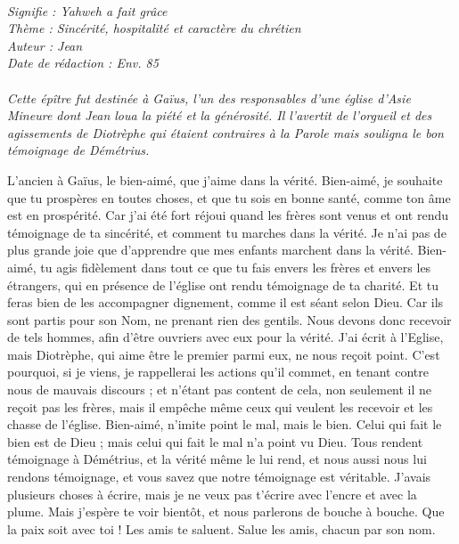 \BFont
\noindent\hrulefill
{\footnotesize
\textit{
\bigskip
{\centering{}
\\Signifie : Yahweh a fait grâce
\\Thème : Sincérité, hospitalité et caractère du chrétien
\\Auteur : Jean
\\Date de rédaction : Env. 85\\}
}
\textit{
\\Cette épître fut destinée à Gaïus, l’un des responsables d’une église d’Asie Mineure dont Jean loua la piété et la générosité. Il l’avertit de l’orgueil et des agissements de Diotrèphe qui étaient contraires à la Parole mais souligna le bon témoignage de Démétrius.\bigskip
}
}
\par\nobreak\noindent\hrulefill
\begin{multicols}{2}
\TextTitle{[Introduction]}
\VerseOne{}L'ancien à Gaïus, le bien-aimé, que j'aime dans la vérité.
Bien-aimé, je souhaite que tu prospères{} en toutes choses, et que tu sois en bonne santé, comme ton âme est en prospérité.
Car j’ai été fort réjoui quand les frères sont venus et ont rendu témoignage de ta sincérité, et comment tu marches dans la vérité.
Je n'ai pas de plus grande joie que d’apprendre que mes enfants marchent dans la vérité.
\TextTitle{[L'hospitalité]}
Bien-aimé, tu agis fidèlement dans tout ce que tu fais envers les frères et envers les étrangers,
qui en présence de l'église ont rendu témoignage de ta charité. Et tu feras bien de les accompagner dignement, comme il est séant selon Dieu.
Car ils sont partis pour son Nom, ne prenant rien des gentils.
Nous devons donc recevoir de tels hommes, afin d’être ouvriers avec eux pour la vérité.
J'ai écrit à l'Eglise, mais Diotrèphe, qui aime être le premier parmi eux, ne nous reçoit point.
C'est pourquoi, si je viens, je rappellerai les actions qu'il commet, en tenant contre nous de mauvais discours ; et n'étant pas content de cela, non seulement il ne reçoit pas les frères, mais il empêche même ceux qui veulent les recevoir et les chasse de l'église.
Bien-aimé, n'imite point le mal, mais le bien. Celui qui fait le bien est de Dieu ; mais celui qui fait le mal n'a point vu Dieu.
Tous rendent témoignage à Démétrius, et la vérité même le lui rend, et nous aussi nous lui rendons témoignage, et vous savez que notre témoignage est véritable.
\TextTitle{[Conclusion]}
J'avais plusieurs choses à écrire, mais je ne veux pas t'écrire avec l'encre et avec la plume.
Mais j'espère te voir bientôt, et nous parlerons de bouche à bouche.
Que la paix soit avec toi ! Les amis te saluent. Salue les amis, chacun par son nom.
\PPE{}
\end{multicols}

